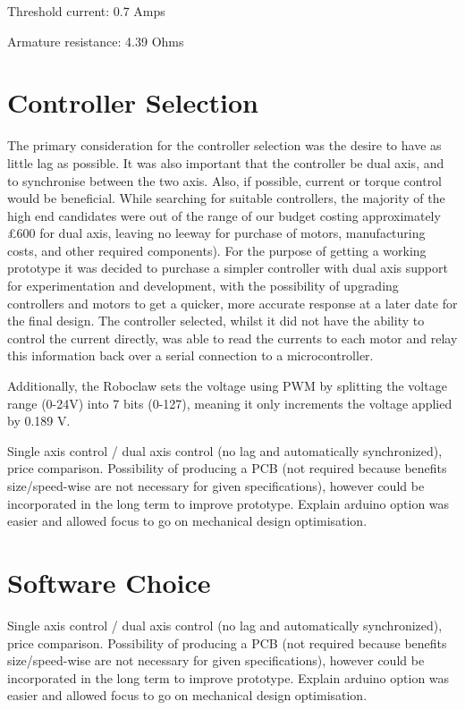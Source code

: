 Threshold current: 0.7 Amps

Armature resistance: 4.39 Ohms

\section{Controller Selection }\label{sec:controller-selection}

The primary consideration for the controller selection was the desire to
have as little lag as possible. It was also important that the
controller be dual axis, and to synchronise between the two axis. Also,
if possible, current or torque control would be beneficial. While
searching for suitable controllers, the majority of the high end
candidates were out of the range of our budget
costing approximately £600 for dual axis, leaving no leeway for purchase
of motors, manufacturing costs, and other required components). For the
purpose of getting a working prototype it was decided to purchase a
simpler controller with dual axis support for experimentation and
development, with the possibility of upgrading controllers and motors to
get a quicker, more accurate response at a later date for the final
design. The controller selected, whilst it did not have the ability to
control the current directly, was able to read the currents to each
motor and relay this information back over a serial connection to a
microcontroller.

Additionally, the Roboclaw sets the voltage using PWM by splitting the
voltage range (0-24V) into 7 bits (0-127), meaning it only increments
the voltage applied by 0.189 V.

Single axis control / dual axis control (no lag and automatically
synchronized), price comparison. Possibility of producing a PCB (not
required because benefits size/speed-wise are not necessary for given
specifications), however could be incorporated in the long term to
improve prototype. Explain arduino option was easier and allowed focus
to go on mechanical design optimisation.

\section{Software Choice}\label{sec:software-choice}

Single axis control / dual axis control (no lag and automatically
synchronized), price comparison. Possibility of producing a PCB (not
required because benefits size/speed-wise are not necessary for given
specifications), however could be incorporated in the long term to
improve prototype. Explain arduino option was easier and allowed focus
to go on mechanical design optimisation.

